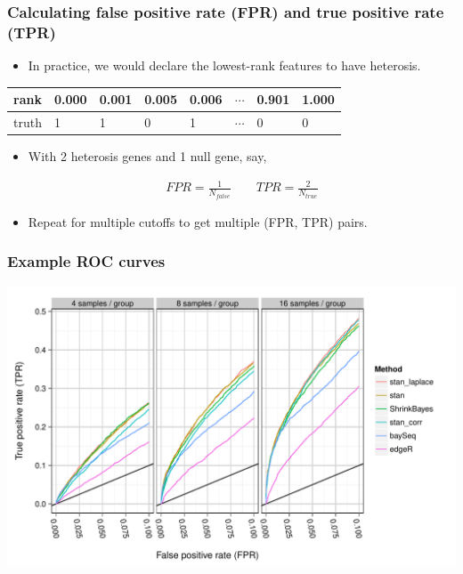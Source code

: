 \documentclass[handout]{beamer}
\numberwithin{equation}{section}
\begin{document}
\begin{frame}
\frametitle{Calculating false positive rate (FPR) and true positive rate (TPR)}

\begin{itemize}
\pause \item In practice, we would declare the lowest-rank features to have heterosis.
\end{itemize}

\pause \begin{tabular}{l|l|l|l|l|l|l|l}
rank & {\color{blue} 0.000} & {\color{blue}0.001} & {\color{blue}0.005} & 0.006 & $\cdots$ & 0.901 & 1.000  \\ \hline
truth & {\color{blue}1} & {\color{blue}1} & {\color{blue}0} & 1 & $\cdots$ & 0 & 0
\end{tabular}

\begin{itemize}
\pause \item With 2 heterosis genes and 1 null gene, say,

\begin{align*}
FPR = \frac{1}{N_{false}} \qquad TPR = \frac{2}{N_{true}}
\end{align*}

\pause \item Repeat for multiple cutoffs to get multiple (FPR, TPR) pairs.
\end{itemize}
\end{frame}


\begin{frame}
\frametitle{Example ROC curves}
\begin{center}
\includegraphics[scale=0.5]{../fig/exampleROC0_1}
\end{center}
\end{frame}
\end{document}
